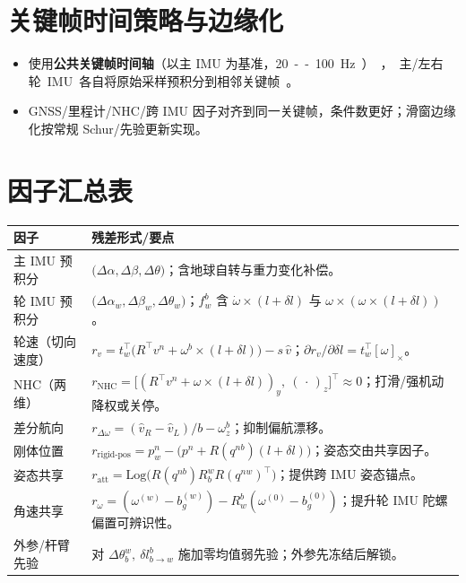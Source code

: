 \documentclass[11pt]{article}
\newcommand{\Log}{\mathrm{Log}}          %
\begin{document}
\section{关键帧时间策略与边缘化}
\begin{itemize}
  \item 使用\textbf{公共关键帧时间轴}（以主 IMU 为基准，\SI{20}--\SI{100}{Hz}），主/左右轮 IMU 各自将原始采样预积分到相邻关键帧。
  \item GNSS/里程计/NHC/跨 IMU 因子对齐到同一关键帧，条件数更好；滑窗边缘化按常规 Schur/先验更新实现。
\end{itemize}

\section{因子汇总表}
\begin{center}
\renewcommand{\arraystretch}{1.2}
\begin{tabular}{@{}p{3.2cm} p{9.6cm}@{}}
\toprule
因子 & 残差形式/要点 \\
\midrule
主 IMU 预积分
& $\big(\Delta \alpha,\Delta \beta,\Delta \theta\big)$；含地球自转与重力变化补偿。\\
轮 IMU 预积分
& $\big(\Delta \alpha_w,\Delta \beta_w,\Delta \theta_w\big)$；$f_w^b$ 含 $\dot\omega\times(l+\delta l)$ 与 $\omega\times(\omega\times(l+\delta l))$。\\
轮速（切向速度）
& $r_v = t_w^\top\!\big(R^\top v^n + \omega^b \times (l+\delta l)\big) - s\,\hat v$；$\partial r_v/\partial \delta l = t_w^\top [\omega]_\times$。\\
NHC（两维）
& $r_{\mathrm{NHC}}=\big[(R^\top v^n + \omega\times(l+\delta l))_y,\ (\,\cdot\,)_z\big]^\top \approx 0$；打滑/强机动降权或关停。\\
差分航向
& $r_{\Delta\omega} = (\hat v_R - \hat v_L)/b - \omega_z^b$；抑制偏航漂移。\\
刚体位置
& $r_{\mathrm{rigid\text{-}pos}} = p_w^n - \big(p^n + R(q^{nb})(l+\delta l)\big)$；姿态交由共享因子。\\
姿态共享
& $r_{\mathrm{att}} = \Log\!\big(R(q^{nb})R_b^{w}R(q^{nw})^\top\big)$；提供跨 IMU 姿态锚点。\\
角速共享
& $r_{\omega} = (\omega^{(w)}-b_g^{(w)}) - R_w^{b}(\omega^{(0)}-b_g^{(0)})$；提升轮 IMU 陀螺偏置可辨识性。\\
外参/杆臂先验
& 对 $\Delta \theta_b^w,\ \delta l_{b\to w}^b$ 施加零均值弱先验；外参先冻结后解锁。\\
\bottomrule
\end{tabular}
\end{center}
\end{document}
